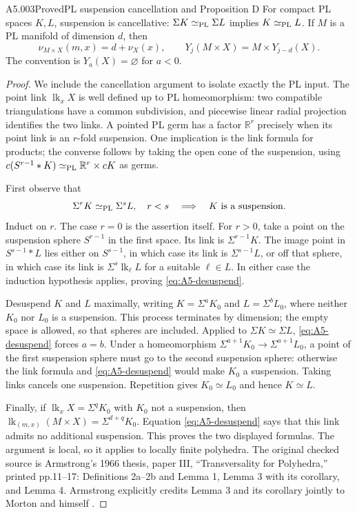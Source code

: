 \begin{saresult}{A5.003}{Proved}{PL suspension cancellation and Proposition D}
For compact PL spaces $K,L$, suspension is cancellative:
$\Sigma K\simeq_{\rm PL}\Sigma L$ implies
$K\simeq_{\rm PL}L$.  If $M$ is a PL manifold of dimension $d$, then
\[
 \nu_{M\times X}(m,x)=d+\nu_X(x),\qquad
 Y_j(M\times X)=M\times Y_{j-d}(X).
\]
The convention is $Y_a(X)=\varnothing$ for $a<0$.
\end{saresult}
\begin{proof}
We include the cancellation argument to isolate exactly the PL input.
The point link $\operatorname{lk}_xX$ is well defined up to PL
homeomorphism: two compatible triangulations have a common
subdivision, and piecewise linear radial projection identifies the
two links.  A pointed PL germ has a factor $\mathbb R^r$ precisely
when its point link is an $r$-fold suspension.  One implication is the
link formula for products; the converse follows by taking the open
cone of the suspension, using
$c(S^{r-1}*K)\simeq_{\rm PL}\mathbb R^r\times cK$ as germs.

First observe that
\begin{equation}\label{eq:A5-desuspend}
 \Sigma^rK\simeq_{\rm PL}\Sigma^sL,\quad r<s
 \quad\Longrightarrow\quad K\text{ is a suspension}.
\end{equation}
Induct on $r$.  The case $r=0$ is the assertion itself.  For $r>0$,
take a point on the suspension sphere $S^{r-1}$ in the first space.
Its link is $\Sigma^{r-1}K$.  The image point in
$S^{s-1}*L$ lies either on $S^{s-1}$, in which case its link is
$\Sigma^{s-1}L$, or off that sphere, in which case its link is
$\Sigma^s\operatorname{lk}_{\ell}L$ for a suitable $\ell\in L$.
In either case the induction hypothesis applies, proving
\eqref{eq:A5-desuspend}.

Desuspend $K$ and $L$ maximally, writing
$K=\Sigma^aK_0$ and $L=\Sigma^bL_0$, where neither $K_0$ nor $L_0$
is a suspension.  This process terminates by dimension; the empty
space is allowed, so that spheres are included.  Applied to
$\Sigma K\simeq\Sigma L$, \eqref{eq:A5-desuspend} forces $a=b$.
Under a homeomorphism
$\Sigma^{a+1}K_0\to\Sigma^{a+1}L_0$, a point of the first suspension
sphere must go to the second suspension sphere: otherwise the link
formula and \eqref{eq:A5-desuspend} would make $K_0$ a suspension.
Taking links cancels one suspension.  Repetition gives $K_0\simeq L_0$
and hence $K\simeq L$.

Finally, if $\operatorname{lk}_xX=\Sigma^qK_0$ with $K_0$ not a
suspension, then
$\operatorname{lk}_{(m,x)}(M\times X)=\Sigma^{d+q}K_0$.
Equation \eqref{eq:A5-desuspend} says that this link admits no
additional suspension.  This proves the two displayed formulas.
The argument is local, so it applies to locally finite polyhedra.
The original checked source is Armstrong's 1966 thesis, paper III,
``Transversality for Polyhedra,'' printed pp.11--17: Definitions
2a--2b and Lemma 1, Lemma 3 with its corollary, and Lemma 4.
Armstrong explicitly credits Lemma 3 and its corollary jointly to
Morton and himself \cite{A5-Armstrong}.
\end{proof}

